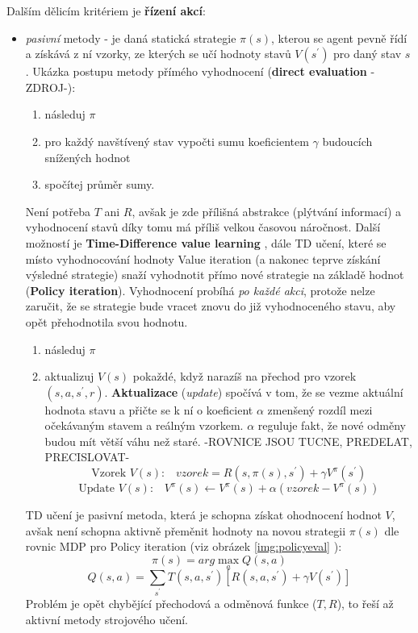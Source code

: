 Dalším dělicím kritériem je \textbf{řízení akcí}:
\begin{itemize}
\item \textit{pasivní} metody - je daná statická strategie $\pi(s)$, kterou se agent pevně řídí a získává z ní vzorky, ze kterých se učí hodnoty stavů $V(s^\prime)$ pro daný stav $s$.
\newline
Ukázka postupu metody přímého vyhodnocení (\textbf{direct evaluation} -ZDROJ-):
\begin{enumerate}
\item následuj $\pi$
\item pro každý navštívený stav vypočti sumu koeficientem $\gamma$ budoucích snížených hodnot
\item spočítej průměr sumy.
\end{enumerate}
Není potřeba $T$ ani $R$, avšak je zde přílišná abstrakce (plýtvání informací) a vyhodnocení stavů díky tomu má příliš velkou časovou náročnost.
\newline
Další možností je \textbf{Time-Difference value learning} \cite{RLIntro}, dále TD učení, které se místo vyhodnocování hodnoty Value iteration (a nakonec teprve získání výsledné strategie) snaží vyhodnotit přímo nové strategie na základě hodnot (\textbf{Policy iteration}). Vyhodnocení probíhá \textit{po každé akci}, protože nelze zaručit, že se strategie bude vracet znovu do již vyhodnoceného stavu, aby opět přehodnotila svou hodnotu.
\begin{enumerate}
\item následuj $\pi$
\item aktualizuj $V(s)$ pokaždé, když narazíš na přechod pro vzorek $(s,a,s^\prime,r)$. \textbf{Aktualizace} (\textit{update}) spočívá v tom, že se vezme aktuální hodnota stavu a přičte se k ní o koeficient $\alpha$ zmenšený rozdíl mezi očekávaným stavem a reálným vzorkem. $\alpha$ reguluje fakt, že nové odměny budou mít větší váhu než staré.
-ROVNICE JSOU TUCNE, PREDELAT, PRECISLOVAT-  
\begin{displaymath}
\textrm{Vzorek $V(s)$:}\quad vzorek = R(s,\pi(s),s^\prime)+\gamma V^\pi(s^\prime)
\end{displaymath}
\begin{displaymath}
\textrm{Update $V(s)$:} \quad V^\pi(s) \leftarrow  V^\pi(s) + \alpha(vzorek - V^\pi(s))
\end{displaymath}
\end{enumerate}
TD učení je pasivní metoda, která je schopna získat ohodnocení hodnot $V$, avšak není schopna aktivně přeměnit hodnoty na novou strategii $\pi(s)$ dle rovnic MDP pro Policy iteration (viz obrázek \ref{img:policyeval} \cite{berkeley}):
\begin{displaymath}
\pi(s) = arg \max_a Q(s,a)
\end{displaymath}
\begin{displaymath}
Q(s,a) = \sum_{s^\prime}T(s,a,s^\prime) \left[R(s,a,s^\prime)+\gamma V(s^\prime) \right]
\end{displaymath}
Problém je opět chybějící přechodová a odměnová funkce ($T,R$), to řeší až aktivní metody strojového učení.


\end{itemize}
